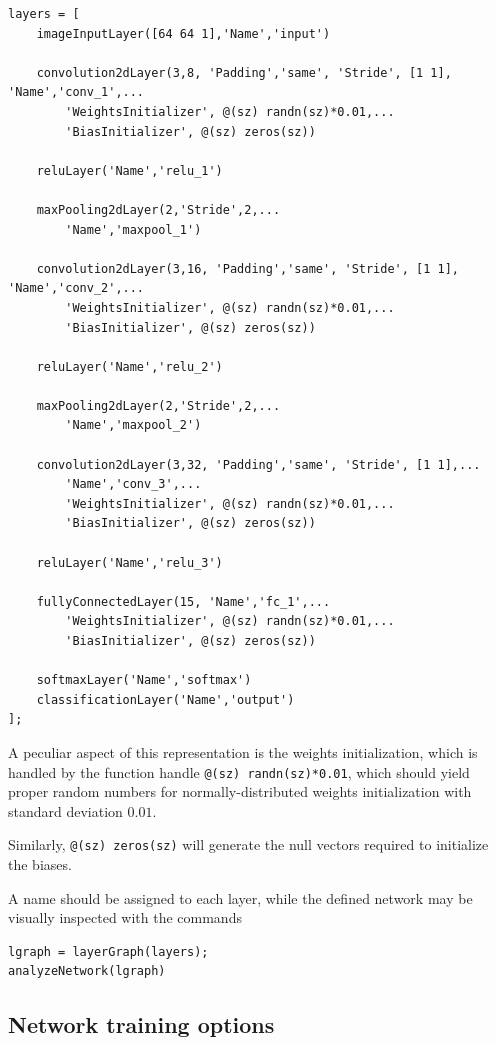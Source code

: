\documentclass[a4paper, 11pt]{article} %
\begin{document}
\begin{lstlisting}
layers = [
    imageInputLayer([64 64 1],'Name','input')
    
    convolution2dLayer(3,8, 'Padding','same', 'Stride', [1 1], 'Name','conv_1',...
        'WeightsInitializer', @(sz) randn(sz)*0.01,...
        'BiasInitializer', @(sz) zeros(sz))

    reluLayer('Name','relu_1')

    maxPooling2dLayer(2,'Stride',2,...
        'Name','maxpool_1')

    convolution2dLayer(3,16, 'Padding','same', 'Stride', [1 1], 'Name','conv_2',...
        'WeightsInitializer', @(sz) randn(sz)*0.01,...
        'BiasInitializer', @(sz) zeros(sz))

    reluLayer('Name','relu_2')

    maxPooling2dLayer(2,'Stride',2,...
        'Name','maxpool_2')

    convolution2dLayer(3,32, 'Padding','same', 'Stride', [1 1],...
        'Name','conv_3',...
        'WeightsInitializer', @(sz) randn(sz)*0.01,...
        'BiasInitializer', @(sz) zeros(sz))

    reluLayer('Name','relu_3')

    fullyConnectedLayer(15, 'Name','fc_1',...
        'WeightsInitializer', @(sz) randn(sz)*0.01,...
        'BiasInitializer', @(sz) zeros(sz))

    softmaxLayer('Name','softmax')
    classificationLayer('Name','output')
];

\end{lstlisting}

A peculiar aspect of this representation is the weights initialization, which is handled by the function handle \texttt{@(sz) randn(sz)*0.01}, which should yield proper random numbers for normally-distributed weights initialization with standard deviation $0.01$. 

Similarly, \texttt{@(sz) zeros(sz)} will generate the null vectors required to initialize the biases.

A name should be assigned to each layer, while the defined network may be visually inspected with the commands

\begin{lstlisting}
lgraph = layerGraph(layers);
analyzeNetwork(lgraph)
\end{lstlisting}

\subsection{Network training options}
\end{document}
